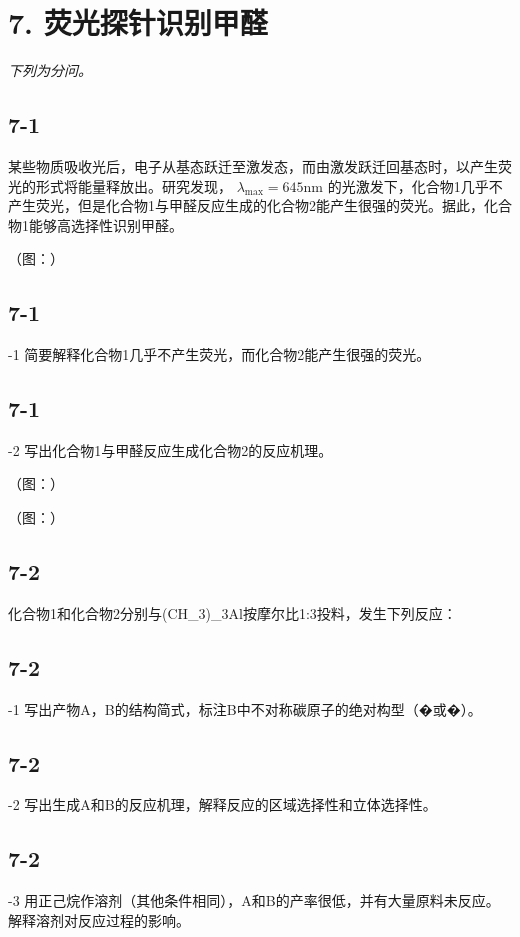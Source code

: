 \section*{7. 荧光探针识别甲醛}
\textit{下列为分问。}

\subsection*{7-1}
某些物质吸收光后，电⼦从基态跃迁⾄激发态，⽽由激发跃迁回基态时，以产⽣荧光的形式将能量释放出。研究发现， $\lambda _ { \operatorname* { m a x } } = 6 4 5 \mathrm { n m }$ 的光激发下，化合物1⼏乎不产⽣荧光，但是化合物1与甲醛反应⽣成的化合物2能产⽣很强的荧光。据此，化合物1能够⾼选择性识别甲醛。

（图：）

\subsection*{7-1}
-1 简要解释化合物1⼏乎不产⽣荧光，⽽化合物2能产⽣很强的荧光。

\subsection*{7-1}
-2 写出化合物1与甲醛反应⽣成化合物2的反应机理。

（图：）

（图：）

\subsection*{7-2}
化合物1和化合物2分别与(CH_{3})_{3}Al按摩尔⽐1:3投料，发⽣下列反应：

\subsection*{7-2}
-1 写出产物A，B的结构简式，标注B中不对称碳原⼦的绝对构型（�或�）。

\subsection*{7-2}
-2 写出⽣成A和B的反应机理，解释反应的区域选择性和⽴体选择性。

\subsection*{7-2}
-3 ⽤正⼰烷作溶剂（其他条件相同），A和B的产率很低，并有⼤量原料未反应。解释溶剂对反应过程的影响。
